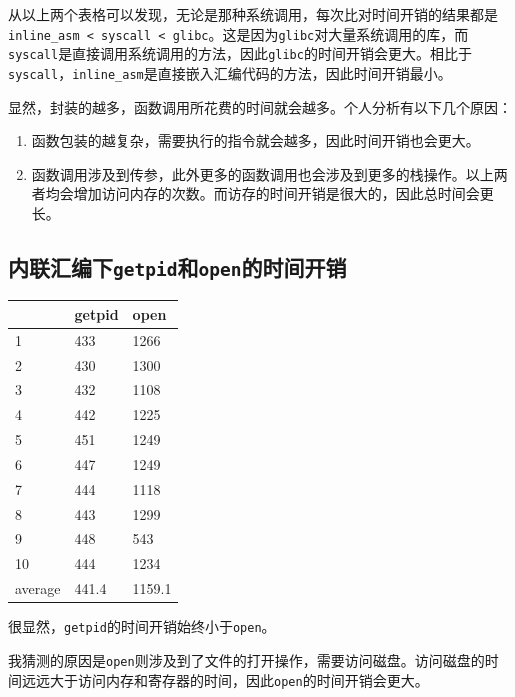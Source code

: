 从以上两个表格可以发现，无论是那种系统调用，每次比对时间开销的结果都是{\tt inline\_asm < syscall < glibc}。这是因为{\tt glibc}对大量系统调用的库，而{\tt syscall}是直接调用系统调用的方法，因此{\tt glibc}的时间开销会更大。相比于{\tt syscall}，{\tt inline\_asm}是直接嵌入汇编代码的方法，因此时间开销最小。

显然，封装的越多，函数调用所花费的时间就会越多。个人分析有以下几个原因：

\begin{enumerate}
    \item 函数包装的越复杂，需要执行的指令就会越多，因此时间开销也会更大。
    \item 函数调用涉及到传参，此外更多的函数调用也会涉及到更多的栈操作。以上两者均会增加访问内存的次数。而访存的时间开销是很大的，因此总时间会更长。
\end{enumerate}

\subsection{内联汇编下{\tt getpid}和{\tt open}的时间开销}

\begin{table}[!ht]
    \centering
    \begin{tabular}{|l|l|l|}
    \hline
        ~ & getpid & open \\ \hline
        1 & 433 & 1266 \\ \hline
        2 & 430 & 1300 \\ \hline
        3 & 432 & 1108 \\ \hline
        4 & 442 & 1225 \\ \hline
        5 & 451 & 1249 \\ \hline
        6 & 447 & 1249 \\ \hline
        7 & 444 & 1118 \\ \hline
        8 & 443 & 1299 \\ \hline
        9 & 448 & 543 \\ \hline
        10 & 444 & 1234 \\ \hline
        average & 441.4 & 1159.1 \\ \hline
    \end{tabular}
\end{table}

很显然，{\tt getpid}的时间开销始终小于{\tt open}。

我猜测的原因是{\tt open}则涉及到了文件的打开操作，需要访问磁盘。访问磁盘的时间远远大于访问内存和寄存器的时间，因此{\tt open}的时间开销会更大。

